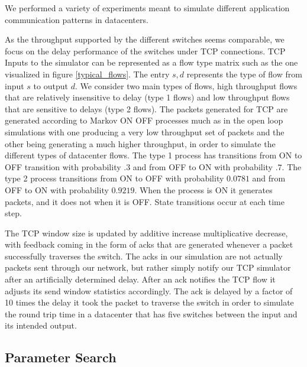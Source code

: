 \documentclass[11pt]{article}%
\begin{document}
We performed a variety of experiments meant to simulate different application communication patterns in datacenters.

As the throughput supported by the different switches seems comparable, we focus on the delay performance of the switches under TCP connections.  TCP Inputs to the simulator can be represented as a flow type matrix such as the one visualized in figure \ref{typical_flows}.  The entry $s,d$ represents the type of flow from input $s$ to output $d$.  We consider two main types of flows, high throughput flows that are relatively insensitive to delay (type 1 flows) and low throughput flows that are sensitive to delays (type 2 flows).  The packets generated for TCP are generated according to Markov ON OFF processes much as in the open loop simulations with one producing a very low throughput set of packets and the other being generating a much higher throughput, in order to simulate the different types of datacenter flows.  The type 1 process has transitions from ON to OFF transition with probability $.3$ and from OFF to ON with probability $.7$.  The type 2 process transitions from ON to OFF with probability $0.0781$ and from OFF to ON with probability $0.9219$.  When the process is ON it generates packets, and it does not when it is OFF.   State transitions occur at each time step.

The TCP window size is updated by additive increase multiplicative decrease, with feedback coming in the form of acks that are generated whenever a packet successfully traverses the switch.  The acks in our simulation are not actually packets sent through our network, but rather simply notify our TCP simulator after an artificially determined delay.  After an ack notifies the TCP flow it adjusts its send window statistics accordingly.  The ack is delayed by a factor of 10 times the delay it took the packet to traverse the switch in order to simulate the round trip time in a datacenter that has five switches between the input and its intended output.

\subsection{Parameter Search}

\end{document}
